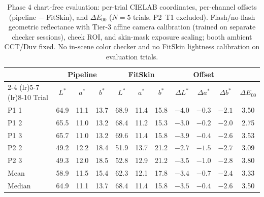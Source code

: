 \begin{table}[h]
\centering
\caption{Phase 4 chart-free evaluation: per-trial CIELAB coordinates, per-channel offsets (pipeline $-$ FitSkin), and $\Delta E_{00}$ ($N = 5$ trials, P2~T1 excluded). Flash/no-flash geometric reflectance with Tier-3 affine camera calibration (trained on separate checker sessions), cheek ROI, and skin-mask exposure scaling; booth ambient CCT/Duv fixed. No in-scene color checker and no FitSkin lightness calibration on evaluation trials.}
\label{tab:phase4_chartfree}
\begin{tabular}{lcccccccccc}
\toprule
& \multicolumn{3}{c}{Pipeline} & \multicolumn{3}{c}{FitSkin} &
\multicolumn{3}{c}{Offset} & \\
\cmidrule(lr){2-4} \cmidrule(lr){5-7} \cmidrule(lr){8-10}
Trial & $L^*$ & $a^*$ & $b^*$ & $L^*$ & $a^*$ & $b^*$ &
$\Delta L^*$ & $\Delta a^*$ & $\Delta b^*$ & $\Delta E_{00}$ \\
\midrule
P1 1 & 64.9 & 11.1 & 13.7 & 68.9 & 11.4 & 15.8 & $-4.0$ & $-0.3$ & $-2.1$ & 3.50 \\
P1 2 & 65.5 & 11.0 & 13.2 & 68.4 & 11.2 & 15.3 & $-3.0$ & $-0.2$ & $-2.0$ & 2.75 \\
P1 3 & 65.7 & 11.0 & 13.2 & 69.6 & 11.4 & 15.8 & $-3.9$ & $-0.4$ & $-2.6$ & 3.53 \\
P2 2 & 49.2 & 12.2 & 18.4 & 51.9 & 13.7 & 21.2 & $-2.7$ & $-1.5$ & $-2.7$ & 3.09 \\
P2 3 & 49.3 & 12.0 & 18.5 & 52.8 & 12.9 & 21.2 & $-3.5$ & $-1.0$ & $-2.8$ & 3.80 \\
\midrule
Mean   & 58.9 & 11.5 & 15.4 & 62.3 & 12.1 & 17.8 & $-3.4$ & $-0.7$ & $-2.4$ & 3.33 \\
Median & 64.9 & 11.1 & 13.7 & 68.4 & 11.4 & 15.8 & $-3.5$ & $-0.4$ & $-2.6$ & 3.50 \\
\bottomrule
\end{tabular}
\end{table}
